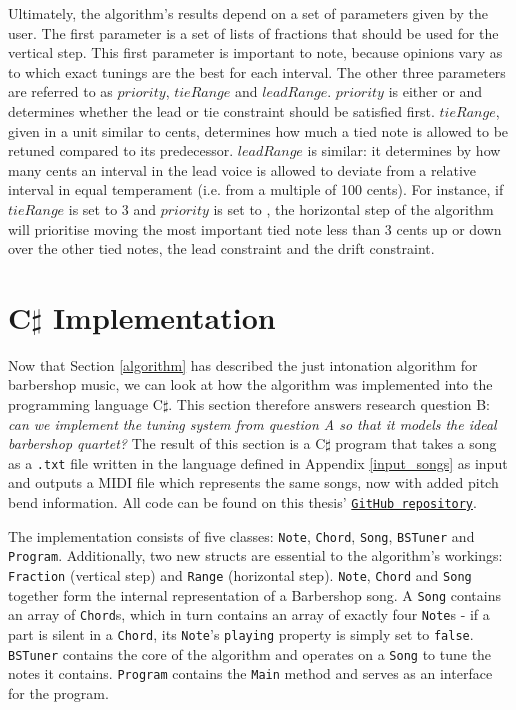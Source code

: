 \documentclass[a4paper]{article}
\begin{document}
Ultimately, the algorithm's results depend on a set of parameters given by the user. The first parameter is a set of lists of fractions that should be used for the vertical step. This first parameter is important to note, because opinions vary as to which exact tunings are the best for each interval. The other three parameters are referred to as $\mathit{priority}$, $\mathit{tieRange}$ and $\mathit{leadRange}$. $\mathit{priority}$ is either  or  and determines whether the lead or tie constraint should be satisfied first. $\mathit{tieRange}$, given in a unit similar to cents, determines how much a tied note is allowed to be retuned compared to its predecessor. $\mathit{leadRange}$ is similar: it determines by how many cents an interval in the lead voice is allowed to deviate from a relative interval in equal temperament (i.e. from a multiple of 100 cents). For instance, if $\mathit{tieRange}$ is set to 3 and $\mathit{priority}$ is set to , the horizontal step of the algorithm will prioritise moving the most important tied note less than 3 cents up or down over the other tied notes, the lead constraint and the drift constraint.

\section{C$\sharp$ Implementation}
\label{implementation}
Now that Section \ref{algorithm} has described the just intonation algorithm for barbershop music, we can look at how the algorithm was implemented into the programming language C$\sharp$. This section therefore answers research question B: {\it can we implement the tuning system from question A so that it models the ideal barbershop quartet?} The result of this section is a C$\sharp$ program that takes a song as a \texttt{.txt} file written in the language defined in Appendix \ref{input_songs} as input and outputs a MIDI file which represents the same songs, now with added pitch bend information. All code can be found on this thesis' \texttt{\href{https://GitHub.com/teuncb/AdaptiveBarbershop}{GitHub repository}}.

The implementation consists of five classes: \texttt{Note}, \texttt{Chord}, \texttt{Song}, \texttt{BSTuner} and \texttt{Program}. Additionally, two new structs are essential to the algorithm's workings: \texttt{Fraction} (vertical step) and \texttt{Range} (horizontal step). \texttt{Note}, \texttt{Chord} and \texttt{Song} together form the internal representation of a Barbershop song. A \texttt{Song} contains an array of \texttt{Chord}s, which in turn contains an array of exactly four \texttt{Note}s - if a part is silent in a \texttt{Chord}, its \texttt{Note}'s \texttt{playing} property is simply set to \texttt{false}. \texttt{BSTuner} contains the core of the algorithm and operates on a \texttt{Song} to tune the notes it contains. \texttt{Program} contains the \texttt{Main} method and serves as an interface for the program.
\end{document}
